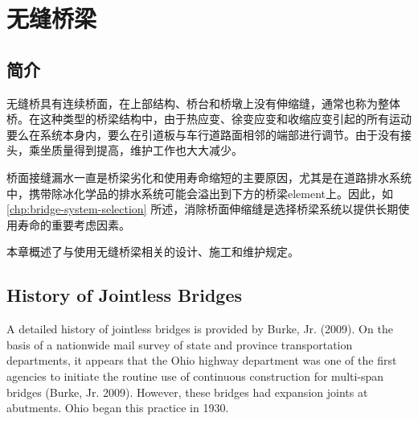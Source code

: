 \chapter{无缝桥梁}\label{chp:jointless-bridge}
\section{简介}
无缝桥具有连续桥面，在上部结构、桥台和桥墩上没有伸缩缝，通常也称为整体桥。在这种类型的桥梁结构中，由于热应变、徐变应变和收缩应变引起的所有运动要么在系统本身内，要么在引道板与车行道路面相邻的端部进行调节。由于没有接头，乘坐质量得到提高，维护工作也大大减少。


桥面接缝漏水一直是桥梁劣化和使用寿命缩短的主要原因，尤其是在道路排水系统中，携带除冰化学品的排水系统可能会溢出到下方的桥梁\gls{element}上。因此，如\cref{chp:bridge-system-selection} 所述，消除桥面伸缩缝是选择桥梁系统以提供长期使用寿命的重要考虑因素。

本章概述了与使用无缝桥梁相关的设计、施工和维护规定。

\section{History of Jointless Bridges}
A detailed history of jointless bridges is provided by Burke, Jr. (2009). On the basis of a nationwide mail survey of state and province transportation departments, it appears that the Ohio highway department was one of the first agencies to initiate the routine use of continuous construction for multi-span bridges (Burke, Jr. 2009). However, these bridges had expansion joints at abutments. Ohio began this practice in 1930.

